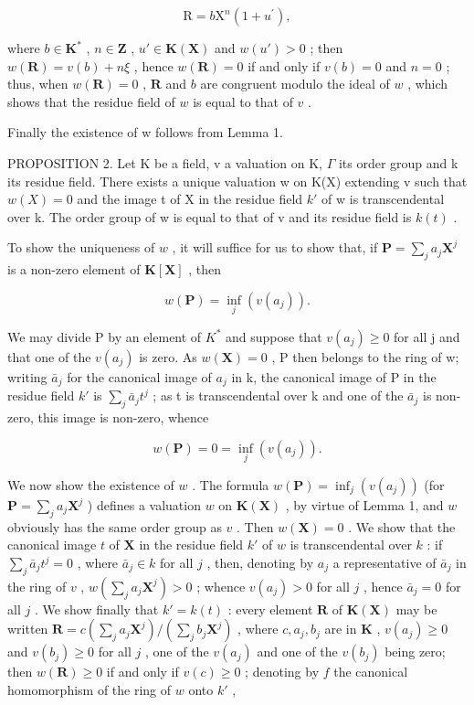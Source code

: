 \[
\mathrm{R} = b \mathrm{X} ^ {n} (1 + u ^ {\prime}),
\]

where \(b \in \mathbf{K}^*\) , \(n \in \mathbf{Z}\) , \(u' \in \mathbf{K}(\mathbf{X})\) and \(w(u') > 0\) ; then \(w(\mathbf{R}) = v(b) + n\xi\) , hence \(w(\mathbf{R}) = 0\) if and only if \(v(b) = 0\) and \(n = 0\) ; thus, when \(w(\mathbf{R}) = 0\) , \(\mathbf{R}\) and \(b\) are congruent modulo the ideal of \(w\) , which shows that the residue field of \(w\) is equal to that of \(v\) .

Finally the existence of w follows from Lemma 1.

PROPOSITION 2. Let K be a field, v a valuation on K, \(\Gamma\) its order group and k its residue field. There exists a unique valuation w on K(X) extending v such that \(w(X) = 0\) and the image t of X in the residue field \(k'\) of w is transcendental over k. The order group of w is equal to that of v and its residue field is \(k(t)\) .

To show the uniqueness of \(w\) , it will suffice for us to show that, if \(\mathbf{P} = \sum_{j} a_j \mathbf{X}^j\) is a non-zero element of \(\mathbf{K}[\mathbf{X}]\) , then

\[
w (\mathbf {P}) = \inf _ {j} (v (a _ {j})).
\]

We may divide P by an element of \(K^{*}\) and suppose that \(v(a_{j}) \geqslant 0\) for all j and that one of the \(v(a_{j})\) is zero. As \(w(\mathbf{X}) = 0\) , P then belongs to the ring of w; writing \(\bar{a}_{j}\) for the canonical image of \(a_{j}\) in k, the canonical image of P in the residue field \(k'\) is \(\sum_{j} \bar{a}_{j} t^{j}\) ; as t is transcendental over k and one of the \(\bar{a}_{j}\) is non-zero, this image is non-zero, whence

\[
w (\mathbf {P}) = 0 = \inf _ {j} (v (a _ {j})).
\]

We now show the existence of \(w\) . The formula \(w(\mathbf{P}) = \inf_{j}(v(a_j))\) (for \(\mathbf{P} = \sum_{j} a_j \mathbf{X}^j\) ) defines a valuation \(w\) on \(\mathbf{K}(\mathbf{X})\) , by virtue of Lemma 1, and \(w\) obviously has the same order group as \(v\) . Then \(w(\mathbf{X}) = 0\) . We show that the canonical image \(t\) of \(\mathbf{X}\) in the residue field \(k'\) of \(w\) is transcendental over \(k\) : if \(\sum_{j} \bar{a}_j t^j = 0\) , where \(\bar{a}_j \in k\) for all \(j\) , then, denoting by \(a_j\) a representative of \(\bar{a}_j\) in the ring of \(v\) , \(w\left(\sum_{j} a_j \mathbf{X}^j\right) > 0\) ; whence \(v(a_j) > 0\) for all \(j\) , hence \(\bar{a}_j = 0\) for all \(j\) . We show finally that \(k' = k(t)\) : every element \(\mathbf{R}\) of \(\mathbf{K}(\mathbf{X})\) may be written \(\mathbf{R} = c\left(\sum_{j} a_j \mathbf{X}^j\right) / \left(\sum_{j} b_j \mathbf{X}^j\right)\) , where \(c, a_j, b_j\) are in \(\mathbf{K}\) , \(v(a_j) \geqslant 0\) and \(v(b_j) \geqslant 0\) for all \(j\) , one of the \(v(a_j)\) and one of the \(v(b_j)\) being zero; then \(w(\mathbf{R}) \geqslant 0\) if and only if \(v(c) \geqslant 0\) ; denoting by \(f\) the canonical homomorphism of the ring of \(w\) onto \(k'\) ,

